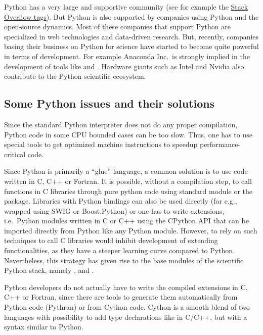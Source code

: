 Python has a very large and supportive community (see for example
the \href{http://stackoverflow.com/tags}{Stack Overflow tags}).
%
But Python is also supported by companies using Python and the open-source
dynamics.  Most of these companies that support Python are specialized in
web technologies and data-driven research.  But, recently, companies basing
their business
on Python for science have started to become quite powerful in terms of
development. For example Anaconda Inc.\ is strongly implied in the development of
tools like  and . Hardware giants such as Intel and Nvidia
also contribute to the Python scientific ecosystem.


\subsection{Some Python issues and their solutions}

Since the standard Python interpreter does not do any proper
compilation, Python code in some CPU bounded cases can be too slow. Thus, one
has to use special tools to get optimized machine instructions to speedup
performance-critical code.

  Since Python is primarily a ``glue''
language, a common solution is to use code written in C, C++ or Fortran.
%
%
It is possible, without a compilation step, to call functions in C libraries
through pure python code using  standard module or the 
package.
%
Libraries with Python bindings can also be used directly (for e.g., wrapped
using SWIG or Boost.Python) or one has to write extensions, i.e.\ Python
modules written in C or C++ using the CPython API that can be imported directly
from Python like any Python module.
%
However, to rely on such techniques to call C libraries would inhibit
development of extending functionalities, as they have a steeper learning
curve compared to Python.
%
Nevertheless, this strategy has given rise to the base modules of the scientific
Python stack, namely \Numpy, \Scipy and .

Python developers do not actually have to write the compiled extensions in C,
C++ or Fortran, since there are tools to generate them automatically from
Python code (Pythran) or from Cython code. Cython \citep{behnel_cython2011} is a
smooth blend of two languages with possibility to add type declarations like in
C/C++, but with a syntax similar to Python.


